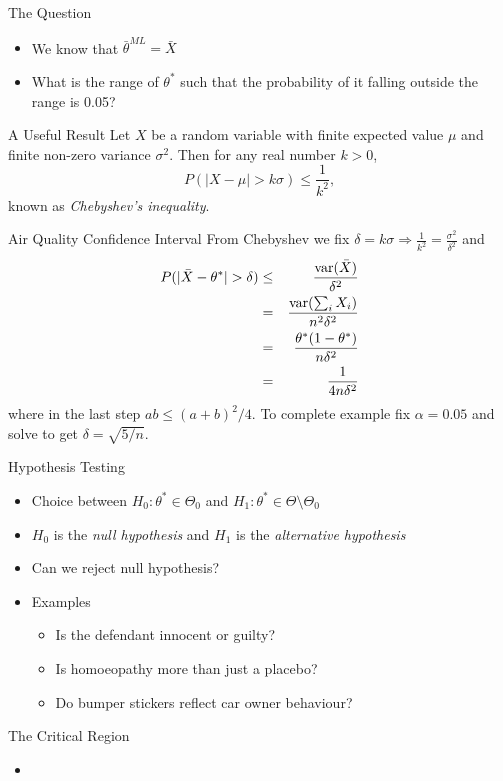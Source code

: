 \documentclass{beamer}
\begin{document}
 \begin{frame}{The Question}  
 \begin{itemize} 
  \item We know that $\bar{\theta}^{ML} = \bar{X}$ 
  \item What is the range of $\theta^*$ such that the probability of it falling outside the range is 0.05? 
 \end{itemize}
 \end{frame}

\begin{frame}{A Useful Result} 
Let $X$ be a random variable with finite expected value $\mu$ and finite non-zero variance $\sigma^2$. Then for any real number $k > 0$, 
\begin{displaymath} 
 P(|X - \mu| > k \sigma) \leq \frac{1}{k^2},
\end{displaymath}
known as \emph{Chebyshev's inequality}. 
\end{frame}

\begin{frame}{Air Quality Confidence Interval}  
From  Chebyshev we fix $\delta = k\sigma \Rightarrow \frac{1}{k^2} = \frac{\sigma^2}{\delta^2}$ and 
\begin{eqnarray*} 
 P(|\bar{X} - \theta^*| > \delta) &\leq& \frac{\mbox{var}(\bar{X})}{\delta^2} \\
&=& \frac{\mbox{var}(\sum_i X_i)}{n^2\delta^2} \\ 
&=& \frac{\theta^*(1 - \theta^*)}{n\delta^2}  \\ 
&=& \frac{1}{4n\delta^2}  
\end{eqnarray*}
where in the last step $ab \leq (a+b)^2/4$. To complete example fix $\alpha = 0.05$ and solve to get $\delta = \sqrt{5/n}$. 
\end{frame}

\begin{frame}{Hypothesis Testing}  
\begin{itemize} 
\item Choice between $H_0: \theta^* \in \Theta_0$ and $H_1: \theta^* \in \Theta \setminus \Theta_0$
\item $H_0$ is the \emph{null hypothesis} and $H_1$ is the \emph{alternative hypothesis} 
\item Can we reject null hypothesis? 
\item Examples 
\begin{itemize} 
\item Is the defendant innocent or guilty? 
\item Is homoeopathy more than just a placebo? 
\item Do bumper stickers reflect car owner behaviour? 
\end{itemize}
\end{itemize}
\end{frame}

\begin{frame}{The Critical Region} 
\begin{itemize} 
 \item 
\end{itemize}
 
\end{frame}
\end{document}
